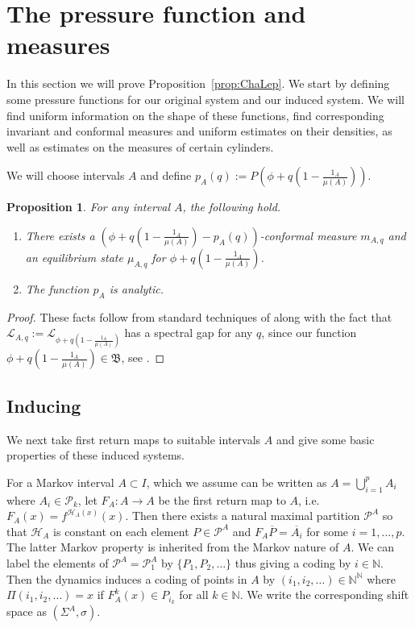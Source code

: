 \documentclass[11pt, reqno]{amsart}
\numberwithin{equation}{section}
\theoremstyle{plain}%
\newtheorem{prop}[thm]{Proposition}
\theoremstyle{definition}
\def\N{\ensuremath{\mathbb N}}
\def\L{\ensuremath{\mathcal L}}
\def\P{\ensuremath{\mathcal P}}
\renewcommand{\H}{\mathcal{H}}
\theoremstyle{nonumberplain}
\begin{document}
\section{The pressure function and measures}\label{section:largedev}


In this section we will  prove Proposition~\ref{prop:ChaLep}.   
 We start by defining some pressure functions for our original system and our induced system.  We will find uniform information on the shape of these functions, find corresponding invariant and conformal measures and uniform estimates on their densities, as well as estimates on the measures of certain cylinders.  
 
We will choose intervals $A$ and define $p_A(q):= P\left(\phi+q\left(1-\frac{1_A}{\mu(A)}\right)\right)$.

\begin{prop}  For any interval $A$, the following hold.
\begin{enumerate}
\item[(a)] There exists a $\left(\phi+q\left(1-\frac{1_A}{\mu(A)}\right)-p_A(q)\right)$-conformal measure $m_{A, q}$ and an equilibrium state $\mu_{A, q}$ for $\phi+q\left(1-\frac{1_A}{\mu(A)}\right)$.
\item[(b)] The function $p_A$ is analytic.
\end{enumerate}
\label{prop:PP}
\end{prop}


\begin{proof}
These facts follow from standard techniques of \cite[Chapter 4]{ParPol90} along with the fact that $\L_{A, q}:= \L_{\phi+ q\left(1-\frac{1_A}{\mu(A)}\right)}$ has a spectral gap for any $q$, since our function $\phi+q\left(1-\frac{1_A}{\mu(A)}\right)\in \mathfrak{B}$, see \cite{Ryc83}.  
\end{proof}



\subsection{Inducing}
We next take first return maps to suitable intervals $A$ and give some basic properties of these induced systems.

For a Markov interval $A \subset I$, which we assume can be written as $A=\bigcup_{i=1}^p A_i$ where $A_i\in\P_k$,  let $F_A:A \to A$ be the first return map to $A$, i.e. $F_A(x)=f^{\H_A(x)}(x)$.  Then there exists a natural maximal partition $\P^A$ so that $\H_A$ is constant on each element $P\in \P^A$ and $F_A\overline P = \overline{A_{i}}$ for some $i=1, \ldots, p$. The latter Markov property is inherited from the Markov nature of $A$.
We can label the elements of $\P^A= \P_1^A$ by $\{P_1, P_2, \ldots\}$ thus giving a coding by $i\in \N$.  Then the dynamics induces a coding of points in $A$ by $(i_1, i_2, \ldots)\in \N^{\N}$ where $\Pi(i_1, i_2, \ldots) =x$ if $F_A^k(x)\in P_{i_k}$ for all $k \in \N$.  We write the corresponding shift space as $(\Sigma^A, \sigma)$.
\end{document}
